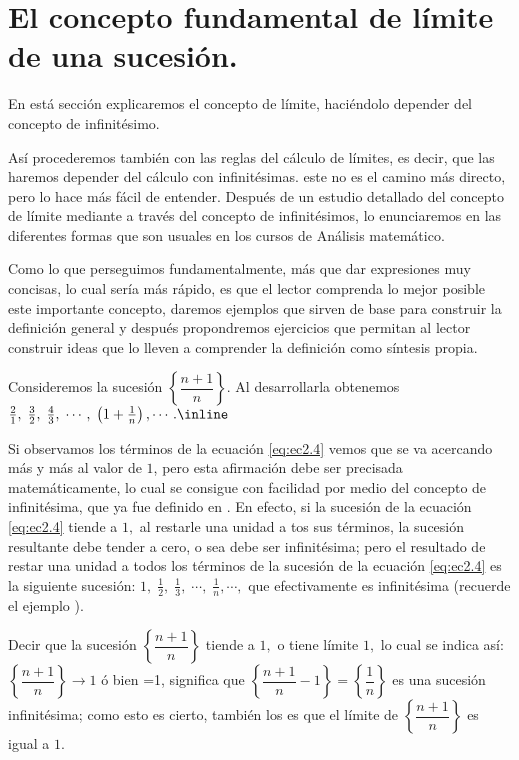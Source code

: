 \section{El concepto fundamental de límite de una sucesión.}

\intro

En está sección explicaremos el concepto de límite, haciéndolo depender
del concepto de infinitésimo.

Así procederemos también con las reglas del cálculo de límites, es
decir, que las haremos depender del cálculo con infinitésimas. este
no es el camino más directo, pero lo hace más fácil de entender. Después
de un estudio detallado del concepto de límite mediante a través del
concepto de infinitésimos, lo enunciaremos en las diferentes formas
que son usuales en los cursos de Análisis matemático.

Como lo que perseguimos fundamentalmente, más que dar expresiones
muy concisas, lo cual sería más rápido, es que el lector comprenda
lo mejor posible este importante concepto, daremos ejemplos que sirven
de base para construir la definición general y después propondremos
ejercicios que permitan al lector construir ideas que lo lleven a
comprender la definición como síntesis propia. 

\begin{ejemplo}\label{ej:ejem2.3}

Consideremos la sucesión $\left\{ \dfrac{n+1}{n}\right\} .$ Al desarrollarla
obtenemos $\frac{2}{1},\;\frac{3}{2},\;\frac{4}{3},\;\cdots,\;\left(1+\frac{1}{n}\right),\cdots.\inline\text{\label{eq:ec2.4}}$ 

Si observamos los términos de la ecuación \ref{eq:ec2.4} vemos que
se va acercando más y más al valor de $1$, pero esta afirmación debe
ser precisada matemáticamente, lo cual se consigue con facilidad por
medio del concepto de infinitésima, que ya fue definido en .
En efecto, si la sucesión de la ecuación \ref{eq:ec2.4} tiende a
$1,$ al restarle una unidad a tos sus términos, la sucesión resultante
debe tender a cero, o sea debe ser infinitésima; pero el resultado
de restar una unidad a todos los términos de la sucesión de la ecuación
\ref{eq:ec2.4} es la siguiente sucesión: $1,\;\frac{1}{2},\;\frac{1}{3},\;\cdots,\;\frac{1}{n},\cdots,$
que efectivamente es infinitésima (recuerde el ejemplo 
). 

\end{ejemplo}

\resu Decir que la sucesión $\left\{ \dfrac{n+1}{n}\right\} $ tiende
a $1,$ o tiene límite $1,$ lo cual se indica así: $\left\{ \dfrac{n+1}{n}\right\} \rightarrow1$
ó bien =1,  significa que $\left\{ \dfrac{n+1}{n}-1\right\} =\left\{ \dfrac{1}{n}\right\} $
es una sucesión infinitésima; como esto es cierto, también los es
que el límite de $\left\{ \dfrac{n+1}{n}\right\} $ es igual a $1.$

